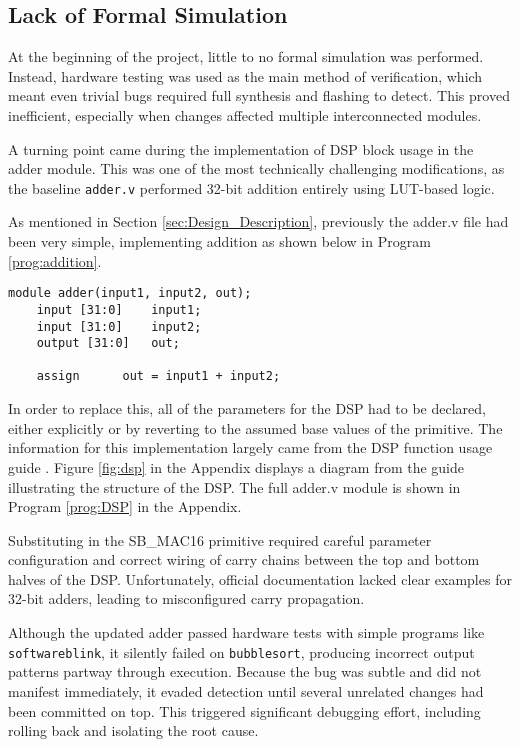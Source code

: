 \documentclass[a4paper,10pt]{article}
\begin{document}
\subsection*{Lack of Formal Simulation}
At the beginning of the project, little to no formal simulation was performed. 
Instead, hardware testing was used as the main method of verification, 
which meant even trivial bugs required full synthesis and flashing to detect. 
This proved inefficient, especially when changes 
affected multiple interconnected modules.

A turning point came during the implementation of DSP block usage in the adder module. 
This was one of the most technically challenging modifications, 
as the baseline \texttt{adder.v} performed 32-bit 
addition entirely using LUT-based logic. 

As mentioned in Section \ref{sec:Design_Description},
previously the adder.v file had been very simple,
implementing addition as shown below in Program \ref{prog:addition}.

\begin{lstlisting}[style=verilog-style, caption=
    {Initial adder.v module}, label={prog:addition}]
module adder(input1, input2, out);
	input [31:0]	input1;
	input [31:0]	input2;
	output [31:0]	out;

	assign		out = input1 + input2;
\end{lstlisting}

In order to replace this, all of the parameters for the DSP had to be declared,
either explicitly or by reverting to the assumed base values of the primitive.
The information for this implementation largely came from the 
DSP function usage guide \cite{DSP_guide}.
Figure \ref{fig:dsp} in the Appendix displays a diagram from the guide 
illustrating the structure of the DSP.
The full adder.v module is shown in Program \ref{prog:DSP}
in the Appendix.

Substituting in the SB\_MAC16 primitive required careful parameter configuration 
and correct wiring of carry chains between the top and bottom halves of the DSP. 
Unfortunately, official documentation lacked clear examples for 32-bit adders, 
leading to misconfigured carry propagation.

Although the updated adder passed hardware tests with simple programs like 
\texttt{softwareblink}, it silently failed on \texttt{bubblesort}, 
producing incorrect output patterns partway through execution. 
Because the bug was subtle and did not manifest immediately, 
it evaded detection until several unrelated changes had been committed on top. 
This triggered significant debugging effort, including rolling back 
and isolating the root cause.
\end{document}
